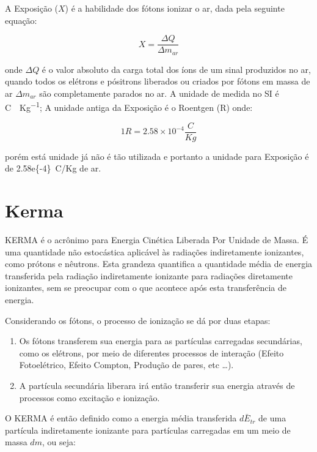 \documentclass[11pt,a4paper]{article}
\begin{document}
		A Exposição ($X$) é a habilidade dos fótons ionizar o ar, dada pela seguinte equação:

			\begin{equation}
				X = \frac{\Delta Q}{\Delta m_{ar}}
			\end{equation}

		\noindent onde $\Delta Q$ é o valor absoluto da carga total dos íons de um sinal produzidos no ar, quando todos os elétrons e pósitrons liberados ou criados por fótons em  massa de ar $\Delta m_{ar}$ são completamente parados no ar. A unidade de medida no SI é \unit{C \cdot Kg^{-1}}; A unidade antiga da Exposição é o Roentgen (R) onde:

			\begin{equation*}
				1 R = 2.58 \times 10 ^{-4}\frac{C}{Kg}
			\end{equation*}

		\noindent porém está unidade já não é tão utilizada e portanto a unidade para Exposição é de \qty{2.58e{-4}}{C/Kg} de ar.

	\section{Kerma}

		KERMA é o acrônimo para Energia Cinética Liberada Por Unidade de Massa. É uma quantidade não estocástica aplicável às radiações indiretamente ionizantes, como prótons e nêutrons. Esta grandeza quantifica a quantidade média de energia transferida pela radiação indiretamente ionizante para radiações diretamente ionizantes, sem se preocupar com o que acontece após esta transferência de energia. 

		Considerando os fótons, o processo de ionização se dá por duas etapas: 

			\begin{enumerate}
				\item Os fótons transferem sua energia para as partículas carregadas secundárias, como os elétrons, por meio de diferentes processos de interação (Efeito Fotoelétrico, Efeito Compton, Produção de pares, etc \dots).
				
				\item A partícula secundária liberara irá então transferir sua energia através de processos como excitação e ionização. 
			\end{enumerate}

		O KERMA é então definido como a energia média transferida $d\bar{E}_{tr}$ de uma partícula indiretamente ionizante para partículas carregadas em um meio de massa $dm$, ou seja:
\end{document}
